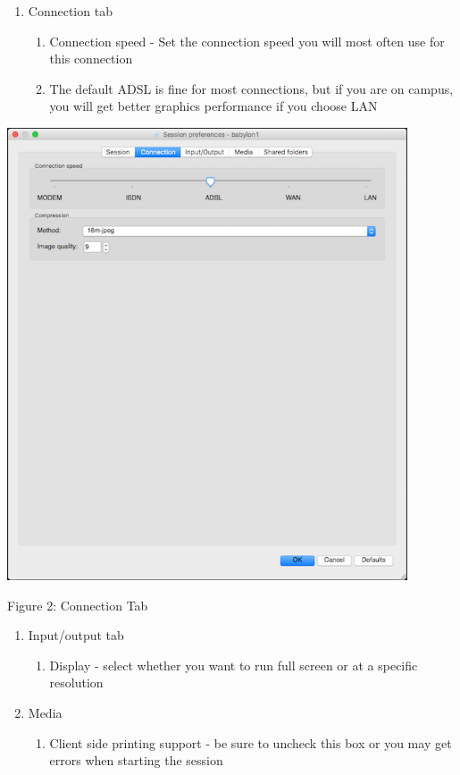 \documentclass{article}
\begin{document}
\begin{enumerate}
\def\labelenumi{\arabic{enumi}.}
\setcounter{enumi}{5}
\item
  Connection tab

  \begin{enumerate}
  \def\labelenumii{\arabic{enumii}.}
  \item
    Connection speed - Set the connection speed you will most often use
    for this connection
  \item
    The default ADSL is fine for most connections, but if you are on
    campus, you will get better graphics performance if you choose LAN
  \end{enumerate}
\end{enumerate}

\includegraphics[width=4.66535in,height=5.27165in]{images/media/image2.png}

Figure 2: Connection Tab

\begin{enumerate}
\def\labelenumi{\arabic{enumi}.}
\setcounter{enumi}{6}
\item
  Input/output tab

  \begin{enumerate}
  \def\labelenumii{\arabic{enumii}.}
  \item
    Display - select whether you want to run full screen or at a
    specific resolution
  \end{enumerate}
\item
  Media

  \begin{enumerate}
  \def\labelenumii{\arabic{enumii}.}
  \item
    Client side printing support - be sure to uncheck this box or you
    may get errors when starting the session
  \end{enumerate}
\end{enumerate}
\end{document}
